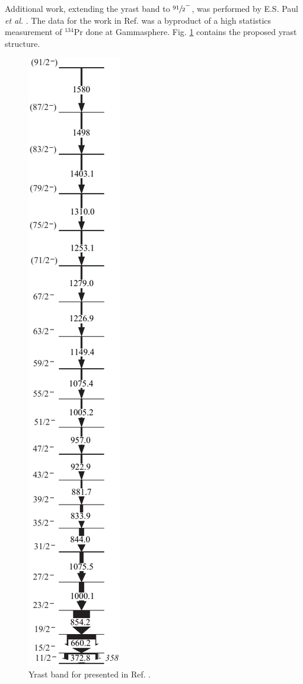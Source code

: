Additional work, extending the yrast band to $\sfrac{91}{2}^-$, was performed by E.S. Paul \emph{et al.} \cite{ePaul135Pr}. The data for the work in Ref. \cite{ePaul135Pr} was a byproduct of a high statistics measurement of $^{134}$Pr done at Gammasphere. Fig. \ref{fig:chp4-paul-prev-bands} contains the proposed yrast structure.
\begin{figure}[h!]
\centerline{\includegraphics[height=0.7\textheight]{./img/c4/high_spin_yrast.pdf}}
	\caption{Yrast band for \pr{} presented in Ref. \cite{ePaul135Pr}. \label{fig:chp4-paul-prev-bands}}
\end{figure}

